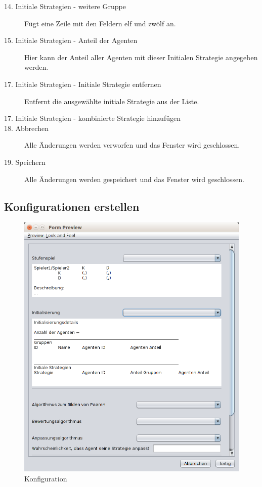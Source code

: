 \begin{description}
\item[14. Initiale Strategien - weitere Gruppe] Fügt eine Zeile mit den Feldern elf und zwölf an.

\item[15. Initiale Strategien - Anteil der Agenten] Hier kann der Anteil aller Agenten mit dieser Initialen Strategie angegeben werden.

\item[17. Initiale Strategien - Initiale Strategie entfernen] Entfernt die ausgewählte initiale Strategie aus der Liste. 

\item[17. Initiale Strategien - kombinierte Strategie hinzufügen] 

\item[18. Abbrechen] Alle Änderungen werden verworfen und das Fenster wird geschlossen.

\item[19. Speichern] Alle Änderungen werden gespeichert und das Fenster wird geschlossen.

\end{description}


\pagebreak

\subsection{Konfigurationen erstellen}

\begin{figure}[hp] 
  \centering
     \includegraphics[width=1.0\textwidth]{GUI_Entwurf/NeueKonfiguration1.png}
  \caption{Konfiguration}
  \label{fig:Bild2}
\end{figure}

